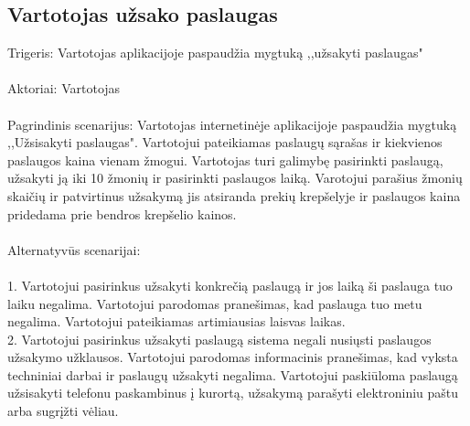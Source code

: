 \documentclass[oneside]{VUMIFPSkursinis}
\begin{document}
\subsection{Vartotojas užsako paslaugas}
	Trigeris: Vartotojas aplikacijoje paspaudžia mygtuką ,,užsakyti paslaugas" \\ \\
	Aktoriai:  Vartotojas \\ \\
	Pagrindinis scenarijus: Vartotojas internetinėje aplikacijoje paspaudžia mygtuką ,,Užsisakyti paslaugas". Vartotojui pateikiamas paslaugų sąrašas ir kiekvienos paslaugos kaina vienam žmogui. Vartotojas turi galimybę pasirinkti paslaugą, užsakyti ją iki 10 žmonių ir pasirinkti paslaugos laiką. Varotojui parašius žmonių skaičių ir patvirtinus užsakymą jis atsiranda prekių krepšelyje ir paslaugos kaina pridedama prie bendros krepšelio kainos. \\ \\
	Alternatyvūs scenarijai:  \\ \\
1. Vartotojui pasirinkus užsakyti konkrečią paslaugą ir jos laiką ši paslauga tuo laiku negalima. Vartotojui parodomas pranešimas, kad paslauga tuo metu negalima. Vartotojui pateikiamas artimiausias laisvas laikas. \\ 
2. Vartotojui pasirinkus užsakyti paslaugą sistema negali nusiųsti paslaugos užsakymo užklausos. Vartotojui parodomas informacinis pranešimas, kad vyksta techniniai darbai ir paslaugų užsakyti negalima. Vartotojui paskiūloma paslaugą užsisakyti telefonu paskambinus į kurortą, užsakymą parašyti elektroniniu paštu arba sugrįžti vėliau.\\ \\
\end{document}
